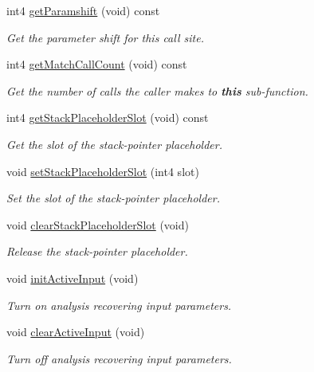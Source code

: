 \begin{DoxyCompactItemize}
int4 \mbox{\hyperlink{class_func_call_specs_adc330a0897cbe51cd961095d77d7a6f0}{get\+Paramshift}} (void) const
\begin{DoxyCompactList}\small\item\em Get the parameter shift for this call site. \end{DoxyCompactList}\item 
int4 \mbox{\hyperlink{class_func_call_specs_a3eae717564dd4884c28623d4a7a7b182}{get\+Match\+Call\+Count}} (void) const
\begin{DoxyCompactList}\small\item\em Get the number of calls the caller makes to {\bfseries{this}} sub-\/function. \end{DoxyCompactList}\item 
int4 \mbox{\hyperlink{class_func_call_specs_abfda84c2a3919927503193ce9595efd6}{get\+Stack\+Placeholder\+Slot}} (void) const
\begin{DoxyCompactList}\small\item\em Get the slot of the stack-\/pointer placeholder. \end{DoxyCompactList}\item 
void \mbox{\hyperlink{class_func_call_specs_ab398038b75b6f13b865384da3fd143b9}{set\+Stack\+Placeholder\+Slot}} (int4 slot)
\begin{DoxyCompactList}\small\item\em Set the slot of the stack-\/pointer placeholder. \end{DoxyCompactList}\item 
void \mbox{\hyperlink{class_func_call_specs_a571062bec4389e2602577b6eed10cbf5}{clear\+Stack\+Placeholder\+Slot}} (void)
\begin{DoxyCompactList}\small\item\em Release the stack-\/pointer placeholder. \end{DoxyCompactList}\item 
void \mbox{\hyperlink{class_func_call_specs_a0b481b6be0cc41e4f1b35089fc5f192b}{init\+Active\+Input}} (void)
\begin{DoxyCompactList}\small\item\em Turn on analysis recovering input parameters. \end{DoxyCompactList}\item 
void \mbox{\hyperlink{class_func_call_specs_af24a93644abe9ee56a9aa86ba4cb0c9f}{clear\+Active\+Input}} (void)
\begin{DoxyCompactList}\small\item\em Turn off analysis recovering input parameters. \end{DoxyCompactList}\item 

\end{DoxyCompactItemize}
